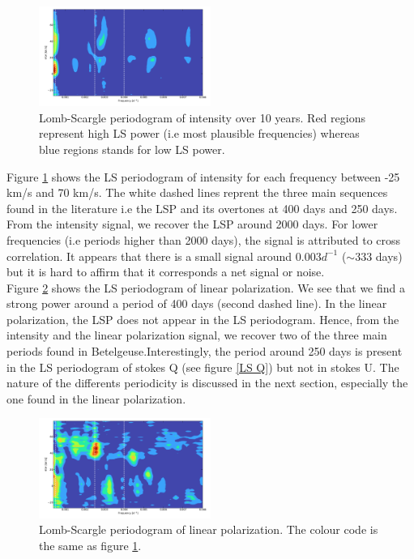 \documentclass{aa}
\begin{document}
\begin{figure}[!h]
    \centering
    \includegraphics[width=0.5\textwidth]{LS Intensity.png}
    \caption{Lomb-Scargle periodogram of intensity over 10 years. Red regions represent high LS power (i.e most plausible frequencies) whereas blue regions stands for low LS power. }
    \label{LS Intensity}
\end{figure}

Figure \ref{LS Intensity} shows the LS periodogram of intensity for each frequency between -25 km/s and 70 km/s. The white dashed lines reprent the three main sequences found in the literature i.e the LSP and its overtones at 400 days and 250 days. From the intensity signal, we recover the LSP around 2000 days. For lower frequencies (i.e periods higher than 2000 days), the signal is attributed to cross correlation. It appears that there is a small signal around $0.003 d^{-1}$ ($\sim 333$ days) but it is hard to affirm that it corresponds a net signal or noise. \\

Figure \ref{LS Pl} shows the LS periodogram of linear polarization. We see that we find a strong power around a period of 400 days (second dashed line). In the linear polarization, the LSP does not appear in the LS periodogram. Hence, from the intensity and the linear polarization signal, we recover two of the three main periods found in Betelgeuse.Interestingly, the period around 250 days is present in the LS periodogram of stokes Q (see figure \ref{LS Q}) but not in stokes U. The nature of the differents periodicity is discussed in the next section, especially the one found in the linear polarization. 


\begin{figure}[!h]
    \centering
    \includegraphics[width=0.5\textwidth]{LS Pl.png}
    \caption{Lomb-Scargle periodogram of linear polarization. The colour code is the same as figure \ref{LS Intensity}. }
    \label{LS Pl}
\end{figure}
\end{document}
